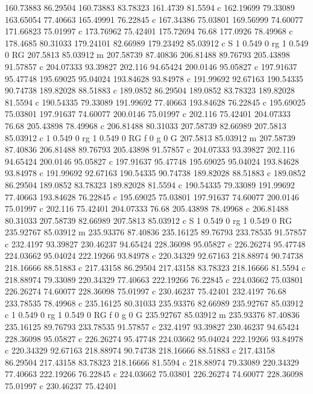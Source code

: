 160.73883 86.29504 
160.73883 83.78323 
161.4739 81.5594 c 
162.19699 79.33089 
163.65054 77.40663 
165.49991 76.22845 c 
167.34386 75.03801 
169.56999 74.60077 
171.66823 75.01997 c 
173.76962 75.42401 
175.72694 76.68 
177.0926 78.49968 c 
178.4685 80.31033 
179.24101 82.66989 
179.23492 85.03912 c 
S 
1 0.549 0 rg 1 0.549 0 RG 
207.5813 85.03912 m 
207.58739 87.40836 
206.81488 89.76793 
205.43898 91.57857 c 
204.07333 93.39827 
202.116 94.65424 
200.0146 95.05827 c 
197.91637 95.47748 
195.69025 95.04024 
193.84628 93.84978 c 
191.99692 92.67163 
190.54335 90.74738 
189.82028 88.51883 c 
189.0852 86.29504 
189.0852 83.78323 
189.82028 81.5594 c 
190.54335 79.33089 
191.99692 77.40663 
193.84628 76.22845 c 
195.69025 75.03801 
197.91637 74.60077 
200.0146 75.01997 c 
202.116 75.42401 
204.07333 76.68 
205.43898 78.49968 c 
206.81488 80.31033 
207.58739 82.66989 
207.5813 85.03912 c 
1 0.549 0 rg 1 0.549 0 RG f 
0 g 0 G 
207.5813 85.03912 m 
207.58739 87.40836 
206.81488 89.76793 
205.43898 91.57857 c 
204.07333 93.39827 
202.116 94.65424 
200.0146 95.05827 c 
197.91637 95.47748 
195.69025 95.04024 
193.84628 93.84978 c 
191.99692 92.67163 
190.54335 90.74738 
189.82028 88.51883 c 
189.0852 86.29504 
189.0852 83.78323 
189.82028 81.5594 c 
190.54335 79.33089 
191.99692 77.40663 
193.84628 76.22845 c 
195.69025 75.03801 
197.91637 74.60077 
200.0146 75.01997 c 
202.116 75.42401 
204.07333 76.68 
205.43898 78.49968 c 
206.81488 80.31033 
207.58739 82.66989 
207.5813 85.03912 c 
S 
1 0.549 0 rg 1 0.549 0 RG 
235.92767 85.03912 m 
235.93376 87.40836 
235.16125 89.76793 
233.78535 91.57857 c 
232.4197 93.39827 
230.46237 94.65424 
228.36098 95.05827 c 
226.26274 95.47748 
224.03662 95.04024 
222.19266 93.84978 c 
220.34329 92.67163 
218.88974 90.74738 
218.16666 88.51883 c 
217.43158 86.29504 
217.43158 83.78323 
218.16666 81.5594 c 
218.88974 79.33089 
220.34329 77.40663 
222.19266 76.22845 c 
224.03662 75.03801 
226.26274 74.60077 
228.36098 75.01997 c 
230.46237 75.42401 
232.4197 76.68 
233.78535 78.49968 c 
235.16125 80.31033 
235.93376 82.66989 
235.92767 85.03912 c 
1 0.549 0 rg 1 0.549 0 RG f 
0 g 0 G 
235.92767 85.03912 m 
235.93376 87.40836 
235.16125 89.76793 
233.78535 91.57857 c 
232.4197 93.39827 
230.46237 94.65424 
228.36098 95.05827 c 
226.26274 95.47748 
224.03662 95.04024 
222.19266 93.84978 c 
220.34329 92.67163 
218.88974 90.74738 
218.16666 88.51883 c 
217.43158 86.29504 
217.43158 83.78323 
218.16666 81.5594 c 
218.88974 79.33089 
220.34329 77.40663 
222.19266 76.22845 c 
224.03662 75.03801 
226.26274 74.60077 
228.36098 75.01997 c 
230.46237 75.42401 
